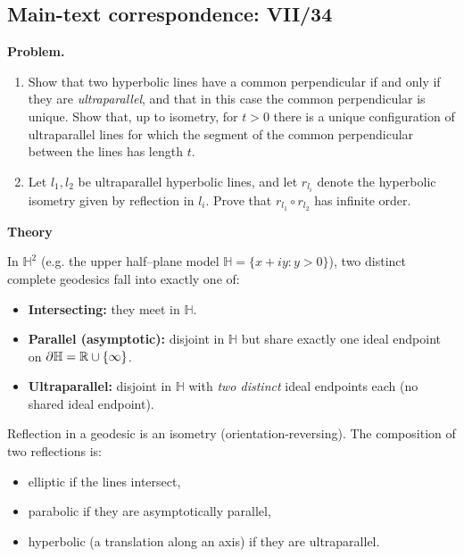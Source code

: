 \subsection*{Main-text correspondence: VII/34}

\begin{problem}
\label{prob:cp-vii-0087}
\par\medskip\noindent\textbf{Problem.}\par\smallskip

	\begin{enumerate}[label=(\alph*)]
		\item Show that two hyperbolic lines have a common perpendicular if and only if they are \emph{ultraparallel},
		and that in this case the common perpendicular is unique. Show that, up to isometry, for $t>0$ there is a unique
		configuration of ultraparallel lines for which the segment of the common perpendicular between the lines has length $t$.
		\item Let $l_1,l_2$ be ultraparallel hyperbolic lines, and let $r_{l_i}$ denote the hyperbolic isometry given by reflection in $l_i$.
		Prove that $r_{l_1}\circ r_{l_2}$ has infinite order.
	\end{enumerate}
	
	
	\par\medskip\noindent\textbf{Theory}\par\smallskip

	In $\mathbb{H}^2$ (e.g. the upper half--plane model $\mathbb{H}=\{x+iy:y>0\}$), two distinct complete geodesics fall into exactly one of:
	\begin{itemize}
		\item \textbf{Intersecting:} they meet in $\mathbb{H}$.
		\item \textbf{Parallel (asymptotic):} disjoint in $\mathbb{H}$ but share exactly one ideal endpoint on $\partial\mathbb{H}=\mathbb{R}\cup\{\infty\}$.
		\item \textbf{Ultraparallel:} disjoint in $\mathbb{H}$ with \emph{two distinct} ideal endpoints each (no shared ideal endpoint).
	\end{itemize}
	Reflection in a geodesic is an isometry (orientation-reversing). The composition of two reflections is:
	\begin{itemize}
		\item elliptic if the lines intersect,
		\item parabolic if they are asymptotically parallel,
		\item hyperbolic (a translation along an axis) if they are ultraparallel.
	\end{itemize}
\end{problem}

